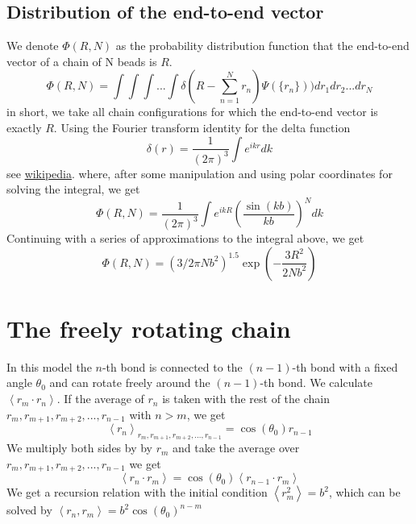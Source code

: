 \documentclass{report}
\begin{document}
\subsection{Distribution of the end-to-end vector}\label{subsection_distributionOfTheEndToEndVector}
We denote $\Phi(R,N)$ as the probability distribution function that the end-to-end vector of a chain of N beads is $R$.
\begin{equation*}
\Phi(R,N) =\int\int\int...\int\delta(R-\sum_{n=1}^Nr_n)\Psi(\{r_n\}))dr_1dr_2...dr_N
\end{equation*}
in short, we take all chain configurations for which the end-to-end vector is exactly $R$. Using the Fourier transform identity for the delta function
\begin{equation*}
\delta(r)= \frac{1}{(2\pi)^3}\int e^{ikr} dk
\end{equation*}
see \href{http://en.wikipedia.org/wiki/Dirac_delta_function}{wikipedia}.
where, after some manipulation and using polar coordinates for solving the integral, we get
\begin{equation*}
\Phi(R,N)=\frac{1}{(2\pi)^3}\int e^{ikR} \left(\frac{\sin(kb)}{kb}\right)^N dk
\end{equation*}
Continuing with a series of approximations to the integral above, we get
\begin{equation*}
\Phi(R,N)=(3/2\pi N b^2)^{1.5} \exp(-\frac{3R^2}{2Nb^2})
\end{equation*}

\section{The freely rotating chain}
In this model the $n$-th bond is connected to the $(n-1)$-th bond with a fixed angle $\theta_0$ and can rotate freely around the $(n-1)$-th bond. We calculate $\left<r_m\cdot r_n \right>$. If the average of $r_n$ is taken with the rest of the chain $r_m,r_{m+1},r_{m+2},...,r_{n-1}$ with $n>m$, we get 
\begin{equation*}
\left<r_n \right>_{r_m,r_{m+1},r_{m+2},...,r_{n-1}}= \cos(\theta_0)r_{n-1}
\end{equation*}
We multiply both sides by by $r_m$ and take the average over $r_m,r_{m+1},r_{m+2},...,r_{n-1}$ we get 
\begin{equation*}
\left<r_n \cdot r_m \right>= \cos(\theta_0)\left<r_{n-1}\cdot r_m \right>
\end{equation*}
We get a recursion relation with the initial condition $\left<r_m^2 \right>=b^2$, which can be solved by 
$\left<r_n,r_m\right>=b^2\cos(\theta_0)^{n-m}$
\end{document}
